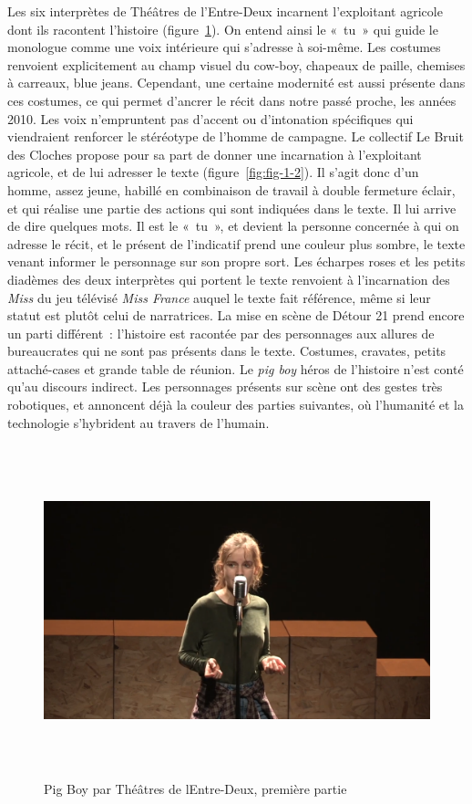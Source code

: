 \documentclass[
]{article}
\begin{document}
Les six interprètes de Théâtres de l'Entre-Deux incarnent l'exploitant agricole dont ils racontent l'histoire (figure~\ref{fig:fig-1-1}). On entend ainsi le «~tu~» qui guide le monologue comme une voix intérieure qui s'adresse à soi-même. Les costumes renvoient explicitement au champ visuel du cow-boy, chapeaux de paille, chemises à carreaux, blue jeans. Cependant, une certaine modernité est aussi présente dans ces costumes, ce qui permet d'ancrer le récit dans notre passé proche, les années 2010. Les voix n'empruntent pas d'accent ou d'intonation spécifiques qui viendraient renforcer le stéréotype de l'homme de campagne. Le collectif Le Bruit des Cloches propose pour sa part de donner une incarnation à l'exploitant agricole, et de lui adresser le texte (figure~\ref{fig:fig-1-2}). Il s'agit donc d'un homme, assez jeune, habillé en combinaison de travail à double fermeture éclair, et qui réalise une partie des actions qui sont indiquées dans le texte. Il lui arrive de dire quelques mots. Il est le «~tu~», et devient la personne concernée à qui on adresse le récit, et le présent de l'indicatif prend une couleur plus sombre, le texte venant informer le personnage sur son propre sort. Les écharpes roses et les petits diadèmes des deux interprètes qui portent le texte renvoient à l'incarnation des \emph{Miss} du jeu télévisé \emph{Miss France} auquel le texte fait référence, même si leur statut est plutôt celui de narratrices. La mise en scène de Détour 21 prend encore un parti différent~: l'histoire est racontée par des personnages aux allures de bureaucrates qui ne sont pas présents dans le texte. Costumes, cravates, petits attaché-cases et grande table de réunion. Le \emph{pig boy} héros de l'histoire n'est conté qu'au discours indirect. Les personnages présents sur scène ont des gestes très robotiques, et annoncent déjà la couleur des parties suivantes, où l'humanité et la technologie s'hybrident au travers de l'humain.

\begin{figure}
\centering
\includegraphics[width=17cm,height=9.601cm]{../assets/Pictures/10000201000004E9000002C6AB55B1C7B6546AEF.png}
\caption{Pig Boy par Théâtres de l\textquotesingle Entre-Deux, première partie}\label{fig:fig-1-1}
\end{figure}
\end{document}
